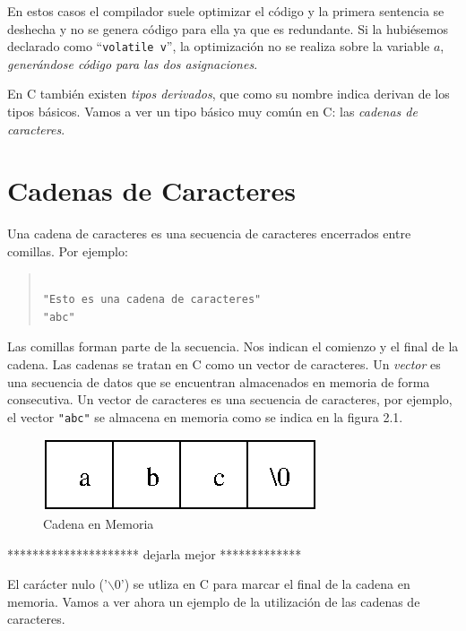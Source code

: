 En estos casos el compilador suele optimizar el c\'odigo y la primera sentencia
se deshecha y no se genera c\'odigo para ella ya que es redundante. Si la 
hubi\'esemos declarado como ``\texttt{volatile v}'', la optimizaci\'on no se
 realiza sobre la variable $a$, \emph{gener\'andose c\'odigo para las dos
asignaciones}.

En C tambi\'en existen \emph{tipos derivados}, que como su nombre indica 
derivan de los tipos b\'asicos. Vamos a ver un tipo b\'asico muy com\'un en
C: las \emph{cadenas de caracteres}.

\section{Cadenas de Caracteres}


Una cadena de caracteres es una secuencia de caracteres encerrados entre
comillas. Por ejemplo:

\begin{quotation}
\begin{verbatim}

"Esto es una cadena de caracteres"
"abc"

\end{verbatim}
\end{quotation}

Las comillas forman parte de la secuencia. Nos indican el comienzo y el final
de la cadena. Las cadenas se tratan en C como un vector de caracteres. Un 
\emph{vector} es una secuencia de datos que se encuentran almacenados en 
memoria de forma consecutiva. Un vector de caracteres es una secuencia de 
caracteres, por ejemplo, el vector \texttt{"abc"} se almacena en memoria 
como se indica en la figura 2.1.

\begin{figure}
\begin{center}
\includegraphics{1.eps}
\end{center}
\caption{Cadena en Memoria}
\end{figure}
********************* dejarla mejor *************

El car\'acter nulo ('$\backslash$0') se utliza en C para marcar el final de 
la cadena en memoria. Vamos a ver ahora un ejemplo de la utilizaci\'on de
las cadenas de caracteres.

